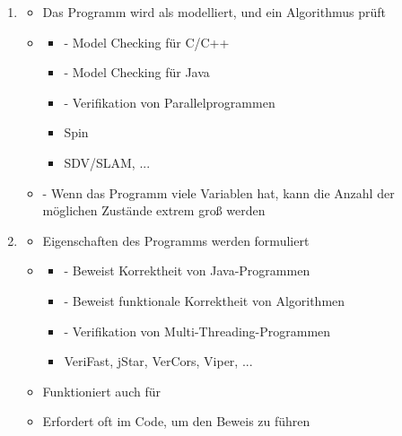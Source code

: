 \begin{infoBox}[title=Arten der formalen Verifikation]
    \begin{enumerate}
        \item {}
        \begin{itemize}
            \item {} Das Programm wird als  modelliert, und ein Algorithmus prüft 
            \item {}
            \begin{itemize}
                \item {} - Model Checking für C/C++
                \item {} - Model Checking für Java
                \item {} - Verifikation von Parallelprogrammen
                \item Spin
                \item SDV/SLAM, ...
            \end{itemize}
            \item {} - Wenn das Programm viele Variablen hat, kann die Anzahl der möglichen Zustände extrem groß werden
        \end{itemize}
        \item {}
        \begin{itemize}
            \item {} Eigenschaften des Programms werden  formuliert
            \item {}
            \begin{itemize}
                \item {} - Beweist Korrektheit von Java-Programmen
                \item {} - Beweist funktionale Korrektheit von Algorithmen
                \item {} - Verifikation von Multi-Threading-Programmen
                \item VeriFast, jStar, VerCors, Viper, ...
            \end{itemize}
            \item {} Funktioniert auch für 
            \item {} Erfordert oft  im Code, um den Beweis zu führen
        \end{itemize}
    \end{enumerate}
\end{infoBox}
